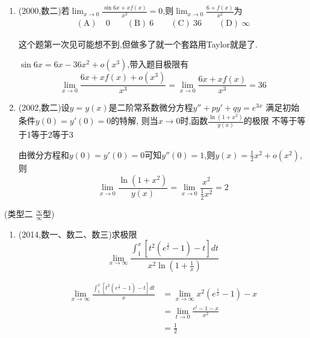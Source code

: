 \documentclass[12pt, a4paper, oneside, UTF8]{ctexbook}
\begin{document}
\begin{enumerate}[label=\arabic*.,start=4]
    \item  (2000,数二)若$\lim_{x\to0}\frac{\sin6x+xf(x)}{x^3}=0$,则$\lim_{x\to0}\frac{6+f(x)}{x^2}$为
    \begin{align*}
        (\text{A})&\ 0 \qquad (\text{B})\ 6 \qquad (\text{C})\ 36 \qquad (\text{D})\ \infty
    \end{align*}
    
    \begin{solution}
    这个题第一次见可能想不到,但做多了就一个套路用Taylor就是了.

    $\sin{6x}=6x-36x^2+o(x^3)$,带入题目极限有
    \[
    \lim_{x\to 0}\frac{6x+xf(x)+o(x^3)}{x^3} = \lim_{x\to 0}\frac{6x+xf(x)}{x^3} = 36
    \]
    \end{solution}
    
    \item  (2002,数二)设$y=y(x)$是二阶常系数微分方程$y''+py'+qy=e^{3x}$
    满足初始条件$y(0)=y'(0)=0$的特解,
    则当$x\to0$时,函数$\frac{\ln(1+x^2)}{y(x)}$的极限
    \newline
    不等于\qquad {}等于1\qquad {}等于2\qquad {}等于3
    
    \begin{solution}
    由微分方程和$y(0)=y'(0)=0$可知$y''(0)=1$,则$y(x)=\frac{1}{2}x^2+o(x^2)$,则
    \[
    \lim_{x\to 0}\frac{\ln(1+x^2)}{y(x)} = \lim_{x\to 0}\frac{x^2}{\frac{1}{2}x^2} = 2
    \]
    \end{solution}
\end{enumerate}

\begin{remark}(类型二 $\frac{\infty}{\infty}$型)
\end{remark}

\begin{enumerate}[label=\arabic*.,start=6]
    \item  (2014,数一、数二、数三)求极限
    \[
    \lim_{x\to \infty}\frac{\int_{1}^{x}\left[t^2(e^{\frac{1}{t}} - 1) - t\right]dt}
    {x^2\ln{(1+\frac{1}{x})}}
    \]
    \begin{solution}
    \begin{align*}
        \lim_{x\to \infty}\frac{\int_{1}^{x}\left[t^2(e^{\frac{1}{t}} - 1) - t\right]dt}
        {x} &= \lim_{x\to \infty} x^2(e^{\frac{1}{x}}-1)-x \\
        & =\lim_{t\to 0}\frac{e^t-1-x}{x^2} \\
        & = \frac{1}{2}
    \end{align*}
    \end{solution}
\end{enumerate}
\end{document}
